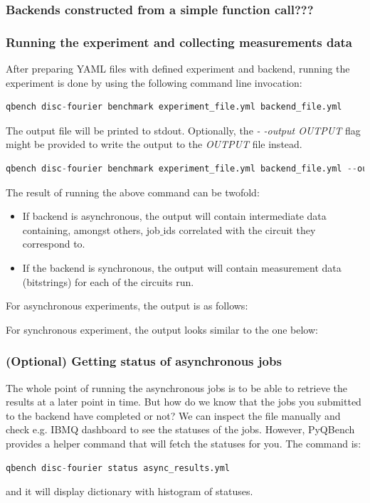\documentclass[preprint,12pt, a4paper, dvipsnames]{elsarticle}
\newcommand{\1}{{\rm 1\hspace{-0.9mm}l}}
\begin{document}
\subsubsection{Backends constructed from a simple function call???}

\subsubsection{Running the experiment and collecting measurements data}
After preparing YAML files with defined experiment and backend, 
running the experiment is done by using the following command line invocation:
\begin{lstlisting}[language=Python]
qbench disc-fourier benchmark experiment_file.yml backend_file.yml
\end{lstlisting}
The output file will be printed to stdout. Optionally, the \textit{- -output OUTPUT} flag might be provided to write the output to the \textit{OUTPUT} file instead.
\begin{lstlisting}[language=Python]
qbench disc-fourier benchmark experiment_file.yml backend_file.yml --output async_results.yml
\end{lstlisting}
The result of running the above command can be twofold:
\begin{itemize}
	\item If backend is asynchronous, the output will contain intermediate data containing, amongst others, job$\_$ids correlated with the circuit they correspond to.
	\item If the backend is synchronous, the output will contain measurement data (bitstrings) for each of the circuits run.
\end{itemize}
For asynchronous experiments, the output is as follows:

For synchronous experiment, the output looks similar to the one below: 

\subsubsection{(Optional) Getting status of asynchronous jobs}
The whole point of running the asynchronous jobs is to be able to retrieve the results at a later point in time. But how do we know that the jobs you submitted to the backend have completed or not? We can inspect the file manually and check e.g. IBMQ dashboard to see the statuses of the jobs. However, PyQBench provides a helper command that will fetch the statuses for you. The command is:
\begin{lstlisting}[language=Python]
qbench disc-fourier status async_results.yml
\end{lstlisting}
and it will display dictionary with histogram of statuses.
\end{document}
